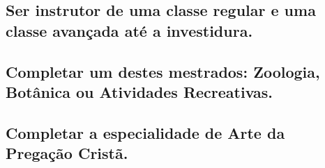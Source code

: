 \subsection{Ser instrutor de uma classe regular e uma classe avançada até a investidura.}

\subsection{Completar um destes mestrados: Zoologia, Botânica ou Atividades Recreativas.}

\subsection{Completar a especialidade de Arte da Pregação Cristã.}